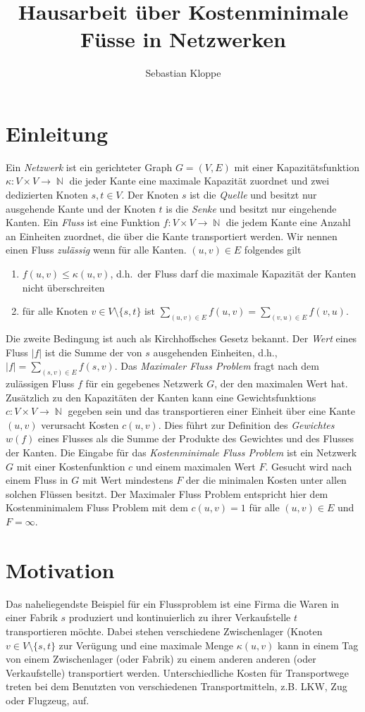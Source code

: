 \documentclass[a4paper]{article}
\title{Hausarbeit \"uber Kostenminimale F\"usse in Netzwerken}
\author{Sebastian Kloppe}
\DeclareMathOperator{\N}{\mathbb{N}}
\begin{document}
\maketitle
\section{Einleitung}
Ein \emph{Netzwerk} ist ein gerichteter Graph $G=(V,E)$ mit 
einer 
Kapazit\"atsfunktion $\kappa: V \times V \rightarrow \N$ 
die jeder Kante 
eine maximale Kapazit\"at zuordnet und zwei dedizierten Knoten
$s,t \in V$. Der Knoten $s$ ist die \emph{Quelle} und 
besitzt nur ausgehende Kante und der Knoten $t$ is die 
\emph{Senke} und besitzt nur eingehende Kanten. 
Ein \emph{Fluss} ist eine Funktion $f: V \times V \rightarrow \N$ 
die jedem Kante 
eine Anzahl an Einheiten zuordnet, die \"uber die Kante 
transportiert werden. Wir nennen einen Fluss \emph{zul\"assig}
wenn f\"ur alle Kanten. $(u,v) \in E$ folgendes gilt
\begin{enumerate}
 \item $f(u,v) \leq \kappa(u,v)$, d.h.~der Fluss darf die 
 maximale Kapazit\"at der Kanten nicht \"uberschreiten
 \item f\"ur alle Knoten $v \in V\setminus \{s,t\}$ ist
 $\sum_{(u,v)\in E}f(u,v) = \sum_{(v,u)\in E}f(v,u)$. 
\end{enumerate}
Die zweite Bedingung ist auch als Kirchhoffsches Gesetz bekannt. 
Der \emph{Wert} eines Fluss $|f|$ ist die Summe der 
von $s$ ausgehenden Einheiten, d.h., 
$|f| = \sum_{(s,v) \in E}f(s,v)$. 
Das \emph{Maximaler Fluss Problem} fragt nach dem zul\"assigen
Fluss $f$ f\"ur ein gegebenes Netzwerk $G$, der den maximalen 
Wert hat. Zus\"atzlich zu den Kapazit\"aten der Kanten kann 
eine Gewichtsfunktions $c: V \times V \rightarrow \N$ gegeben 
sein und das transportieren einer Einheit \"uber eine Kante $(u,v)$
verursacht Kosten $c(u,v)$. Dies f\"uhrt zur Definition des
\emph{Gewichtes} $w(f)$ eines Flusses als die Summe der 
Produkte des Gewichtes und des Flusses der Kanten. 
Die Eingabe f\"ur das \emph{Kostenminimale Fluss Problem} ist 
ein Netzwerk $G$ mit einer Kostenfunktion $c$ und einem maximalen 
Wert $F$. Gesucht wird nach einem Fluss in $G$ mit Wert mindestens
$F$ der die minimalen Kosten unter allen solchen Fl\"ussen besitzt.
Der Maximaler Fluss Problem entspricht hier dem
Kostenminimalem Fluss Problem mit dem $c(u,v) = 1$ f\"ur alle 
$(u,v) \in E$ und $F = \infty$.

\section{Motivation}
Das naheliegendste Beispiel f\"ur ein Flussproblem ist eine 
Firma die Waren in einer Fabrik $s$ produziert und 
kontinuierlich zu ihrer Verkaufstelle $t$ transportieren m\"ochte. 
Dabei stehen verschiedene Zwischenlager 
(Knoten $v \in V \setminus \{s,t\}$  zur Ver\"ugung und eine 
maximale Menge $\kappa(u,v)$ kann in einem Tag von einem 
Zwischenlager (oder Fabrik) zu einem anderen anderen 
(oder Verkaufstelle) transportiert werden. Unterschiedliche Kosten
f\"ur Transportwege treten bei dem Benutzten von verschiedenen 
Transportmitteln, z.B. LKW, Zug oder Flugzeug, auf. 
\end{document}
